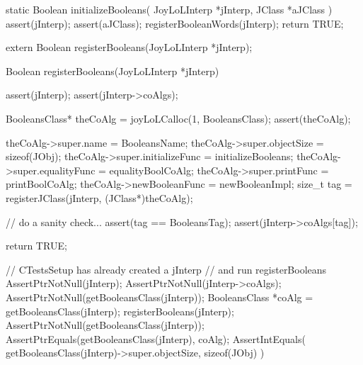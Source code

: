 \startCCode
static Boolean initializeBooleans(
  JoyLoLInterp *jInterp,
  JClass   *aJClass
) {
  assert(jInterp);
  assert(aJClass);
  registerBooleanWords(jInterp);
  return TRUE;
}
\stopCCode

\startCHeader
extern Boolean registerBooleans(JoyLoLInterp *jInterp);
\stopCHeader
{}

\startCCode
Boolean registerBooleans(JoyLoLInterp *jInterp) {
  assert(jInterp);
  assert(jInterp->coAlgs);
  
  BooleansClass* theCoAlg
    = joyLoLCalloc(1, BooleansClass);
  assert(theCoAlg);
  
  theCoAlg->super.name           = BooleansName;
  theCoAlg->super.objectSize     = sizeof(JObj);
  theCoAlg->super.initializeFunc = initializeBooleans;
  theCoAlg->super.equalityFunc   = equalityBoolCoAlg;
  theCoAlg->super.printFunc      = printBoolCoAlg;
  theCoAlg->newBooleanFunc       = newBooleanImpl;
  size_t tag =
    registerJClass(jInterp, (JClass*)theCoAlg);
  
  // do a sanity check...
  assert(tag == BooleansTag);
  assert(jInterp->coAlgs[tag]);
   
  return TRUE;
}
\stopCCode


\startCTest
  // CTestsSetup has already created a jInterp
  // and run registerBooleans
  AssertPtrNotNull(jInterp);
  AssertPtrNotNull(jInterp->coAlgs);
  AssertPtrNotNull(getBooleansClass(jInterp));
  BooleansClass *coAlg = getBooleansClass(jInterp);
  registerBooleans(jInterp);
  AssertPtrNotNull(getBooleansClass(jInterp));
  AssertPtrEquals(getBooleansClass(jInterp), coAlg);
  AssertIntEquals(
    getBooleansClass(jInterp)->super.objectSize,
    sizeof(JObj)
  )
\stopCTest
\stopTestCase
\stopTestSuite
